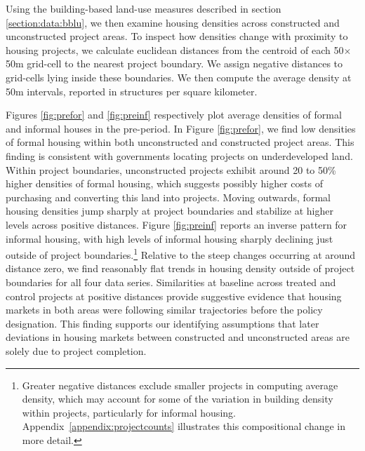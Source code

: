\documentclass[12pt]{article}
\begin{document}
Using the building-based land-use measures described in section \ref{section:data:bblu}, we then examine housing densities across constructed and unconstructed project areas.  To inspect how densities change with proximity to housing projects, we calculate euclidean distances from the centroid of each 50$\times$50m grid-cell to the nearest project boundary. We assign negative distances to grid-cells lying inside these boundaries.  We then compute the average density at 50m intervals, reported in structures per square kilometer.  


Figures \ref{fig:prefor} and \ref{fig:preinf} respectively plot average densities of formal and informal houses in the pre-period. In Figure \ref{fig:prefor}, we find low densities of formal housing within both unconstructed and constructed project areas. This finding is consistent with governments locating projects on underdeveloped land.  Within project boundaries, unconstructed projects exhibit around 20 to 50\% higher densities of formal housing, which suggests possibly higher costs of purchasing and converting this land into projects.  Moving outwards, formal housing densities jump sharply at project boundaries and stabilize at higher levels across positive distances.  Figure \ref{fig:preinf} reports an inverse pattern for informal housing, with high levels of informal housing sharply declining just outside of project boundaries.\footnote{Greater negative distances exclude smaller projects in computing average density, which may account for some of the variation in building density within projects, particularly for informal housing.  Appendix~\ref{appendix:projectcounts} illustrates this compositional change in more detail.} Relative to the steep changes occurring at around distance zero,  we find reasonably flat trends in housing density outside of project boundaries for all four data series. Similarities at baseline across treated and control projects at positive distances provide suggestive evidence that housing markets in both areas were following similar trajectories before the policy designation.  This finding supports our identifying assumptions that later deviations in housing markets between constructed and unconstructed areas are solely due to project completion.
\end{document}
